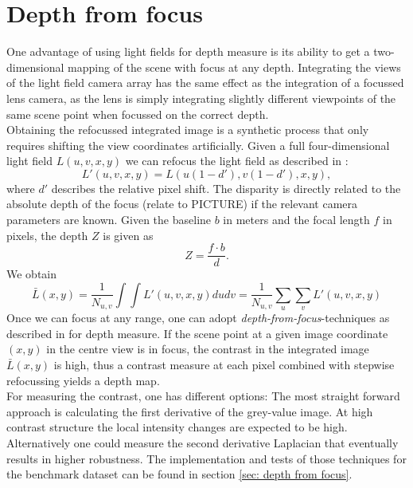 \documentclass  [
  paper    = a4,
  BCOR     = 10mm,
  twoside,
  fontsize = 12pt,
  fleqn,
  toc      = bibnumbered,
  toc      = listofnumbered,
  numbers  = noendperiod,
  headings = normal,
  listof   = leveldown,
  version  = 3.03
]                                       {scrreprt}
\begin{document}
\section{Depth from focus}
\label{sec:theo depth}
One advantage of using light fields for depth measure is its ability to get a two-dimensional mapping of the scene with focus at any depth. Integrating the views of the light field camera array has the same effect as the integration of a focussed lens camera, as the lens is simply integrating slightly different viewpoints of the same scene point when focussed on the correct depth. \\
 Obtaining the refocussed integrated image is a synthetic process that only requires shifting the view coordinates artificially. Given a full four-dimensional light field $L(u, v, x, y)$ we can refocus the light field as described in \cite{ng2005light}:
 \begin{equation}\label{eq:refocus}
L'(u, v, x, y) = L(u(1-d'), v(1-d'), x, y),
\end{equation}
where $d'$ describes the relative pixel shift. The disparity is directly related to the absolute depth of the focus (relate to PICTURE) if the relevant camera parameters are  known. Given the baseline $b$ in meters and the focal length $f$ in pixels, the depth $Z$ is given as \begin{equation}\label{key}
Z = \frac{f\cdot b}{d}.
\end{equation} 
We obtain
\begin{equation}\label{key}
\bar{L}(x,y) = \frac{1}{N_{u,v}}\int\int L'(u, v, x, y) du  dv =\frac{1}{N_{u,v}}\sum_{u}\sum_{v}  L'(u, v, x, y)
\end{equation}
Once we can focus at any range, one can adopt \textit{depth-from-focus}-techniques as described in \cite{watanabe1998rational} for depth measure. If the scene point at a given image coordinate $(x, y)$ in the centre view is in focus, the contrast in the integrated image $\bar{L}(x,y)$ is high, thus a contrast measure at each pixel combined with stepwise refocussing yields a depth map. \\
For measuring the contrast, one has different options: The most straight forward approach is calculating the first derivative of the grey-value image. At high contrast structure the local intensity changes are expected to be high. Alternatively one could measure the second derivative Laplacian that eventually results in higher robustness. The implementation and tests of those techniques for the benchmark dataset can be found in section \ref{sec: depth from focus}.\\
\end{document}

